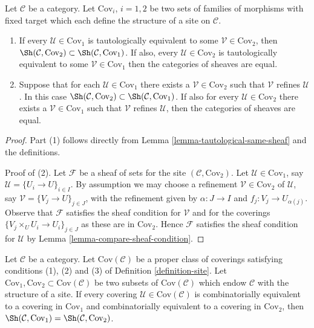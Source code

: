 \begin{lemma}
\label{lemma-refine-same-topology}
Let $\mathcal{C}$ be a category. Let $\text{Cov}_i$, $i = 1, 2$
be two sets of families of morphisms with fixed target which
each define the structure of a site on $\mathcal{C}$.
\begin{enumerate}
\item If every $\mathcal{U} \in \text{Cov}_1$ is tautologically
equivalent to some $\mathcal{V} \in \text{Cov}_2$, then
$\Sh(\mathcal{C}, \text{Cov}_2) \subset
\Sh(\mathcal{C}, \text{Cov}_1)$.
If also, every $\mathcal{U} \in \text{Cov}_2$ is tautologically
equivalent to some $\mathcal{V} \in \text{Cov}_1$ then
the categories of sheaves are equal.
\item Suppose
that for each $\mathcal{U} \in \text{Cov}_1$ there exists a
$\mathcal{V} \in \text{Cov}_2$ such that $\mathcal{V}$ refines
$\mathcal{U}$. In this case
$\Sh(\mathcal{C}, \text{Cov}_2) \subset
\Sh(\mathcal{C}, \text{Cov}_1)$.
If also for every $\mathcal{U} \in \text{Cov}_2$
there exists a $\mathcal{V} \in \text{Cov}_1$ such that $\mathcal{V}$
refines $\mathcal{U}$, then the categories of sheaves
are equal.
\end{enumerate}
\end{lemma}

\begin{proof}
Part (1) follows directly from Lemma \ref{lemma-tautological-same-sheaf}
and the definitions.

\medskip\noindent
Proof of (2). Let $\mathcal{F}$ be a sheaf of sets for the site
$(\mathcal{C}, \text{Cov}_2)$. Let $\mathcal{U} \in \text{Cov}_1$,
say $\mathcal{U} = \{U_i \to U\}_{i \in I}$. By assumption we may choose a
refinement $\mathcal{V} \in \text{Cov}_2$ of $\mathcal{U}$, say
$\mathcal{V} = \{V_j \to U\}_{j \in J}$, with the refinement given
by $\alpha : J \to I$ and $f_j : V_j \to U_{\alpha(j)}$.
Observe that $\mathcal{F}$ satisfies the sheaf condition for
$\mathcal{V}$ and for the coverings $\{V_j \times_U U_i \to U_i\}_{j \in J}$
as these are in $\text{Cov}_2$. Hence $\mathcal{F}$ satisfies
the sheaf condition for $\mathcal{U}$ by
Lemma \ref{lemma-compare-sheaf-condition}.
\end{proof}

\begin{lemma}
\label{lemma-choice-set-coverings-immaterial}
Let $\mathcal{C}$ be a category.
Let $\text{Cov}(\mathcal{C})$ be a proper class of coverings
satisfying conditions (1), (2) and (3) of Definition \ref{definition-site}.
Let $\text{Cov}_1, \text{Cov}_2 \subset \text{Cov}(\mathcal{C})$
be two subsets of $\text{Cov}(\mathcal{C})$ which endow
$\mathcal{C}$ with the structure of a site. If
every covering $\mathcal{U} \in \text{Cov}(\mathcal{C})$
is combinatorially equivalent to a covering in
$\text{Cov}_1$ and combinatorially equivalent to a
covering in $\text{Cov}_2$, then
$\Sh(\mathcal{C}, \text{Cov}_1) =
\Sh(\mathcal{C}, \text{Cov}_2)$.
\end{lemma}

